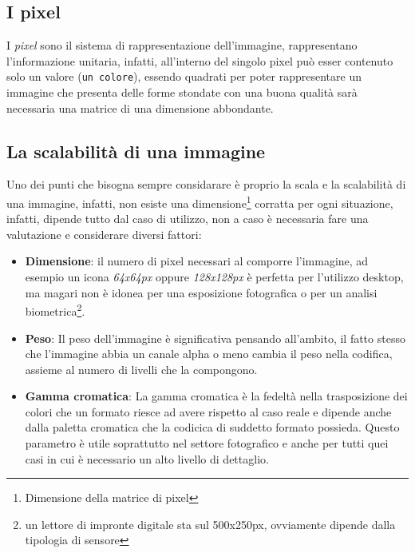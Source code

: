 \subsection{I pixel}
\label{sec:pixel}

I \textit{pixel} sono il sistema di rappresentazione dell'immagine,
rappresentano l'informazione unitaria, infatti, all'interno del singolo
pixel può esser contenuto solo un valore (\texttt{un colore}), essendo
quadrati per poter rappresentare un immagine che presenta delle forme
stondate con una buona qualità sarà necessaria una matrice di una
dimensione abbondante.
\subsection{La scalabilità di una immagine}
\label{sec:scala}
Uno dei punti che bisogna sempre considarare è proprio la scala e
la scalabilità di una immagine, infatti, non esiste una
dimensione\footnote{Dimensione della matrice di pixel} corratta per ogni
situazione, infatti, dipende tutto dal caso di utilizzo, non a caso è
necessaria fare una valutazione e considerare diversi fattori:
\begin{itemize}
\item \textbf{Dimensione}: il numero di pixel necessari al comporre
  l'immagine, ad esempio un icona \textit{64x64px} oppure
  \textit{128x128px} è perfetta per l'utilizzo desktop, ma magari non è
  idonea per una esposizione fotografica o per un analisi
  biometrica\footnote{un lettore di impronte digitale sta sul
    500x250px, ovviamente dipende dalla tipologia di sensore}.
\item \textbf{Peso}: Il peso dell'immagine è significativa pensando
  all'ambito, il fatto stesso che l'immagine abbia un canale alpha o
  meno cambia il peso nella codifica, assieme al numero di livelli che
  la compongono. 
\item \textbf{Gamma cromatica}: La gamma cromatica è la fedeltà nella
  trasposizione dei colori che un formato riesce ad avere rispetto al
  caso reale e dipende anche dalla paletta cromatica che la codicica di
  suddetto formato possieda. Questo parametro è utile soprattutto nel
  settore fotografico e anche per tutti quei casi in cui è necessario
  un alto livello di dettaglio.
\end{itemize}
